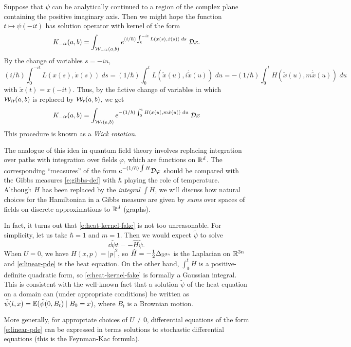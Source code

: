 
Suppose that $\psi$ can be analytically continued to a region of the complex
plane containing the positive imaginary axis. Then we might hope the function
$t \mapsto \psi(-it)$ has solution operator with kernel of the form
\begin{equation}
K_{-it}(a, b)
	=
\int_{\mathcal{W}_{-it}(a, b)} e^{(i/\hbar) \int_0^{-it} L(x(s), \dot x(s)) \; ds} \; \mathcal{D} x.
\end{equation}
By the change of variables $s = -iu$,
\begin{equation}
(i/\hbar) \int_0^{-it} L(x(s), \dot x(s)) \; ds
	=
(1/\hbar) \int_0^t L(\tilde x(u), i \dot{\tilde x}(u)) \; du
	=
-(1/\hbar) \int_0^t H(\tilde x(u), m \dot{\tilde x}(u)) \; du
\end{equation}
with $\tilde x(t) = x(-it)$. Thus, by the fictive change of variables in which
$\mathcal{W}_{it}(a, b)$ is replaced by $\mathcal{W}_t(a, b)$, we get
\begin{equation}
\label{e:heat-kernel-fake}
K_{-it}(a, b)
	=
\int_{\mathcal{W}_t(a, b)} e^{-(1/\hbar) \int_0^t H(x(u), m\dot x(u)) \; du} \; \mathcal{D} x
\end{equation}
This procedure is known as a \emph{Wick rotation}.

The analogue of this idea in quantum field theory involves replacing integration
over paths with integration over fields $\varphi$, which are functions on ${ {{\mathbb R}}^d}$.
The corresponding ``measures'' of the form $e^{-(1/\hbar)\int H} \mathcal{D}\varphi$
should be compared with the Gibbs measures \eqref{e:gibbs-def} with $\hbar$ playing
the role of temperature. Although $H$
has been replaced by the \emph{integral} $\int H$, we will discuss how natural
choices for the Hamiltonian in a Gibbs measure are given by \emph{sums} over
spaces of fields on discrete approximations to ${ {{\mathbb R}}^d}$ (graphs).

\begin{rk}
In fact, it turns out that \eqref{e:heat-kernel-fake} is not too unreasonable.
For simplicity, let us take $\hbar = 1$ and $m = 1$.
Then we would expect $\tilde\psi$ to solve
\begin{equation}
\label{e:linear-pde}
\dd{\tilde\psi}{t} = -\hat H \tilde\psi.
\end{equation}
When $U = 0$, we have $H(x, p) = |p|^2$, so $\hat H = -\tfrac12 \Delta_{{\mathbb R}^{3n}}$
is the Laplacian on ${\mathbb R}^{3n}$ and \eqref{e:linear-pde} is the heat equation.
On the other hand, $\int_0^t H$ is a positive-definite quadratic form, so
\eqref{e:heat-kernel-fake} is formally a Gaussian integral. This is consistent
with the well-known fact that a solution $\tilde\psi$ of the heat equation
on a domain can (under appropriate conditions) be written as
$\tilde\psi(t, x) = \mathbb{E}(\tilde\psi(0, B_t) \mid B_0 = x)$,
where $B_t$ is a Brownian motion.

More generally, for appropriate choices of $U \ne 0$, differential equations of
the form \eqref{e:linear-pde} can be expressed in terms
solutions to stochastic differential equations (this is the Feynman-Kac formula).
\end{rk}

